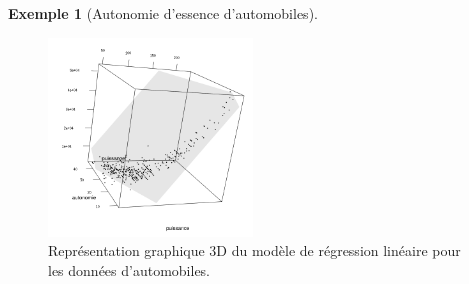 \documentclass[
  11pt,
  letterpaper,
]{scrbook}
\theoremstyle{definition}
\newtheorem{example}{Exemple}[chapter]
\theoremstyle{remark}
\begin{document}
\begin{example}[Autonomie d'essence
d'automobiles]
\begin{figure}[ht!]
{\centering \includegraphics[width=2.14in,height=\textheight]{figures/hyperplan_auto.png}

}

\caption{\label{fig-hyperplan}Représentation graphique 3D du modèle de
régression linéaire pour les données d'automobiles.}

\end{figure}

\end{example}
\end{document}
